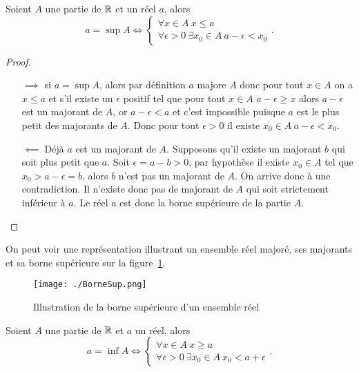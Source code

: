 \begin{theo}
  Soient \(A\) une partie de \(\mathbb{R}\) et un réel \(a\), alors
  \begin{equation}
    a = \sup A \iff \begin{cases} \forall x \in A \ x\leqslant a \\  \forall 
      \epsilon >0 \ \exists x_0 \in A \ a - \epsilon < x_0
    \end{cases}.
  \end{equation}
\end{theo}

\begin{proof}
  \begin{itemize}
    \item[\(\implies\)] si \(a = \sup A\), alors par définition \(a\) majore 
      \(A\) donc pour tout \(x \in A\) on a \(x\leqslant a\) et s'il existe un 
      \(\epsilon\) positif tel que pour tout \(x\in A\) \(a - \epsilon\geqslant 
      x\) alors \(a - \epsilon\) est un majorant de \(A\), or \(a - \epsilon < 
      a\) et c'est impossible puisque \(a\) est le plus petit des majorants de 
      \(A\).  Donc pour tout \(\epsilon >0\) il existe \(x_0\in A \ a - \epsilon 
      < x_0\).
    \item [\(\impliedby\)] Déjà \(a\) est un majorant de \(A\). Supposons qu'il 
      existe un majorant \(b\) qui soit plus petit que \(a\). Soit \(\epsilon = 
      a - b>0\), par hypothèse il existe \(x_0\in A\) tel que \(x_0>a - \epsilon 
      = b\), alors \(b\) n'est pas un majorant de \(A\). On arrive donc à une 
      contradiction. Il n'existe donc pas de majorant de \(A\) qui soit 
      strictement inférieur à \(a\). Le réel \(a\) est donc la borne supérieure 
      de la partie \(A\).
  \end{itemize}
\end{proof}
On peut voir une représentation illustrant un ensemble réel majoré, ses majorants 
et sa borne supérieure sur la figure~\ref{fig:BorneSup}.
\begin{figure}[h]
  \centering
  \texttt{[image: ./BorneSup.png]}
  \caption{Illustration de la borne supérieure d'un ensemble réel}
  \label{fig:BorneSup}
\end{figure}
\begin{theo}
  Soient \(A\) une partie de \(\mathbb{R}\) et \(a\) un réel, alors
  \begin{equation}
    a = \inf A \iff \begin{cases} \forall x \in A \ x\geqslant a \\  \forall 
    \epsilon >0 \ \exists x_0\in A \ x_0<a + \epsilon\end{cases}.
  \end{equation}
\end{theo}
